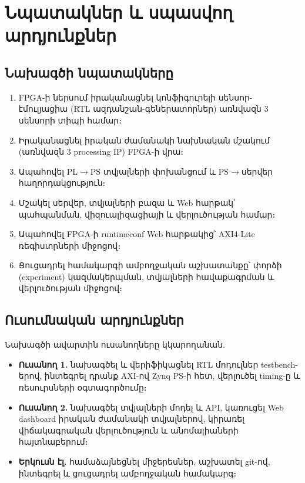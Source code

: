 \chapter{Նպատակներ և սպասվող արդյունքներ}
\label{ch:goals}

\section{Նախագծի նպատակները}
\begin{enumerate}
  \item FPGA-ի ներսում իրականացնել կոնֆիգուրելի սենսոր-էմուլյացիա (RTL ազդանշան-գեներատորներ) առնվազն 3 սենսորի տիպի համար։
  \item Իրականացնել իրական ժամանակի նախնական մշակում (առնվազն 3 processing IP) FPGA-ի վրա։
  \item Ապահովել PL$\rightarrow$PS տվյալների փոխանցում և PS$\rightarrow$սերվեր հաղորդակցություն։
  \item Մշակել սերվեր, տվյալների բազա և Web հարթակ՝ պահպանման, վիզուալիզացիայի և վերլուծության համար։
  \item Ապահովել FPGA-ի \gls{runtimeconf} Web հարթակից՝ AXI4-Lite ռեգիստրների միջոցով։
  \item Ցուցադրել համակարգի ամբողջական աշխատանքը՝ փորձի (\gls{experiment}) կազմակերպման, տվյալների հավաքագրման և վերլուծության միջոցով։
\end{enumerate}

\section{Ուսումնական արդյունքներ}
Նախագծի ավարտին ուսանողները կկարողանան.
\begin{itemize}
  \item \textbf{Ուսանող 1.} նախագծել և վերիֆիկացնել RTL մոդուլներ testbench-երով, ինտեգրել դրանք AXI-ով Zynq PS-ի հետ, վերլուծել timing-ը և ռեսուրսների օգտագործումը։
  \item \textbf{Ուսանող 2.} նախագծել տվյալների մոդել և API, կառուցել Web dashboard իրական ժամանակի տվյալներով, կիրառել վիճակագրական վերլուծություն և անոմալիաների հայտնաբերում։
  \item \textbf{Երկուսն էլ.} համաձայնեցնել միջերեսներ, աշխատել git-ով, ինտեգրել և ցուցադրել ամբողջական համակարգ։
\end{itemize}
